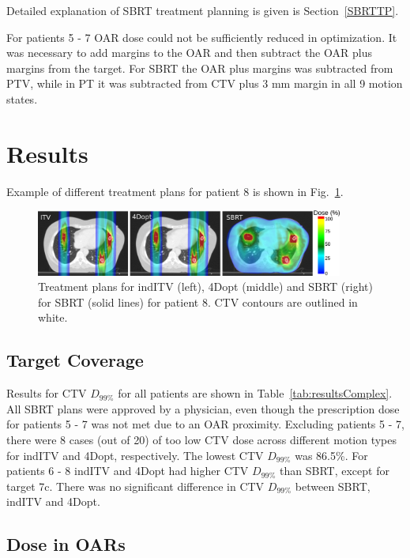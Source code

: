 \documentclass[type=dr, dr=rernat, accentcolor=tud7b,colorbacktitle, bigchapter, openright, twoside, 12pt ]{tudthesis}
\begin{document}
Detailed explanation of SBRT treatment planning is given is Section~\ref{SBRTTP}.

For patients 5 - 7 OAR dose could not be sufficiently reduced in optimization. It was necessary to add margins to the OAR and then 
subtract the OAR plus margins from the target. For SBRT the OAR plus margins was subtracted from PTV, while in PT it was subtracted from CTV plus 3 mm margin in all 9 motion states.

\section{Results}

Example of different treatment plans for patient 8 is shown in Fig.~\ref{Fig:multiExample}.

\begin{figure}[H]
	\begin{center}
		\includegraphics[width=0.9\textwidth]{./Images/multiExample.png}
		\caption{Treatment plans for indITV (left), 4Dopt (middle) and SBRT (right) for SBRT (solid lines) for patient 8. CTV contours are outlined in white.}
		\label{Fig:multiExample}
	\end{center}
\end{figure}

\subsection{Target Coverage}

Results for CTV $D_{99\%}$ for all patients are shown in Table~\ref{tab:resultsComplex}. All SBRT plans were approved by a physician, 
even though the prescription dose for patients 5 - 7 was not met due to an OAR proximity. Excluding patients 5 - 7, there were 8 cases (out of 20) of too low CTV dose across different
motion types for indITV and 4Dopt, respectively. The lowest CTV $D_{99\%}$ was 86.5\%.
For patients 6 - 8 indITV and 4Dopt had higher CTV $D_{99\%}$ than SBRT, except for target 7c.
There was no significant difference in CTV $D_{99\%}$ between SBRT, indITV and 4Dopt.



\subsection{Dose in OARs}
\end{document}
